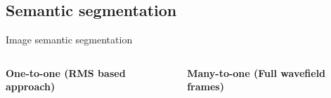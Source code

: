 \documentclass[10pt,aspectratio=169,dvipsnames]{beamer} %
\begin{document}
	\subsection{Semantic segmentation}
	\begin{frame}{Image semantic segmentation}
		\begin{columns}[T]
			\begin{column}[c]{0.48\textwidth}		
				\centering		
				\textbf{One-to-one (RMS based approach)}
				\begin{figure}
					\quad
				\end{figure}
			\end{column}
			\begin{column}[c]{0.48\textwidth}
				\centering
				\textbf{Many-to-one (Full wavefield frames)}
				\centering
				\begin{figure}				
					\quad
				\end{figure}
			\end{column}
		\end{columns}
	\end{frame}
	
\end{document}
